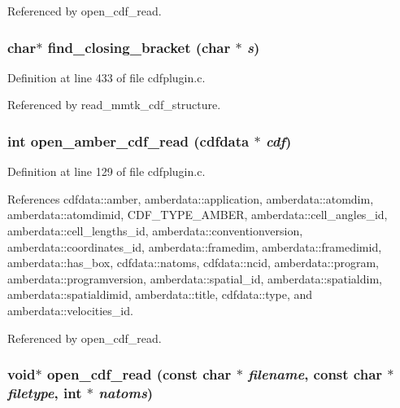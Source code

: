 Referenced by open\_\-cdf\_\-read.
\subsubsection{\setlength{\rightskip}{0pt plus 5cm}char$\ast$ find\_\-closing\_\-bracket (char $\ast$ {\em s})\hspace{0.3cm}{\tt  [static]}}\label{cdfplugin_8c_a8}




Definition at line 433 of file cdfplugin.c.

Referenced by read\_\-mmtk\_\-cdf\_\-structure.
\subsubsection{\setlength{\rightskip}{0pt plus 5cm}int open\_\-amber\_\-cdf\_\-read ({\bf cdfdata} $\ast$ {\em cdf})\hspace{0.3cm}{\tt  [static]}}\label{cdfplugin_8c_a5}




Definition at line 129 of file cdfplugin.c.

References cdfdata::amber, amberdata::application, amberdata::atomdim, amberdata::atomdimid, CDF\_\-TYPE\_\-AMBER, amberdata::cell\_\-angles\_\-id, amberdata::cell\_\-lengths\_\-id, amberdata::conventionversion, amberdata::coordinates\_\-id, amberdata::framedim, amberdata::framedimid, amberdata::has\_\-box, cdfdata::natoms, cdfdata::ncid, amberdata::program, amberdata::programversion, amberdata::spatial\_\-id, amberdata::spatialdim, amberdata::spatialdimid, amberdata::title, cdfdata::type, and amberdata::velocities\_\-id.

Referenced by open\_\-cdf\_\-read.
\subsubsection{\setlength{\rightskip}{0pt plus 5cm}void$\ast$ open\_\-cdf\_\-read (const char $\ast$ {\em filename}, const char $\ast$ {\em filetype}, int $\ast$ {\em natoms})\hspace{0.3cm}{\tt  [static]}}\label{cdfplugin_8c_a7}




